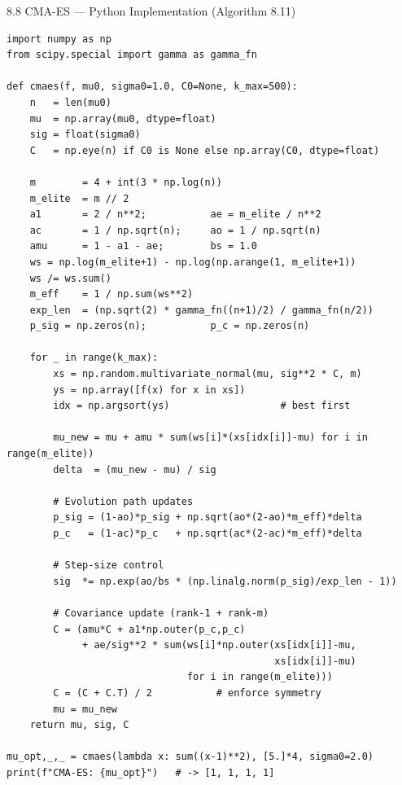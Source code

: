 \documentclass[aspectratio=169,10pt]{beamer}
\begin{document}
\begin{frame}[fragile]{8.8 CMA-ES --- Python Implementation (Algorithm 8.11)}
\begin{lstlisting}[caption={CMA-ES: covariance matrix adaptation evolution strategy}]
import numpy as np
from scipy.special import gamma as gamma_fn

def cmaes(f, mu0, sigma0=1.0, C0=None, k_max=500):
    n   = len(mu0)
    mu  = np.array(mu0, dtype=float)
    sig = float(sigma0)
    C   = np.eye(n) if C0 is None else np.array(C0, dtype=float)

    m        = 4 + int(3 * np.log(n))
    m_elite  = m // 2
    a1       = 2 / n**2;           ae = m_elite / n**2
    ac       = 1 / np.sqrt(n);     ao = 1 / np.sqrt(n)
    amu      = 1 - a1 - ae;        bs = 1.0
    ws = np.log(m_elite+1) - np.log(np.arange(1, m_elite+1))
    ws /= ws.sum()
    m_eff    = 1 / np.sum(ws**2)
    exp_len  = (np.sqrt(2) * gamma_fn((n+1)/2) / gamma_fn(n/2))
    p_sig = np.zeros(n);           p_c = np.zeros(n)

    for _ in range(k_max):
        xs = np.random.multivariate_normal(mu, sig**2 * C, m)
        ys = np.array([f(x) for x in xs])
        idx = np.argsort(ys)                   # best first

        mu_new = mu + amu * sum(ws[i]*(xs[idx[i]]-mu) for i in range(m_elite))
        delta  = (mu_new - mu) / sig

        # Evolution path updates
        p_sig = (1-ao)*p_sig + np.sqrt(ao*(2-ao)*m_eff)*delta
        p_c   = (1-ac)*p_c   + np.sqrt(ac*(2-ac)*m_eff)*delta

        # Step-size control
        sig  *= np.exp(ao/bs * (np.linalg.norm(p_sig)/exp_len - 1))

        # Covariance update (rank-1 + rank-m)
        C = (amu*C + a1*np.outer(p_c,p_c)
             + ae/sig**2 * sum(ws[i]*np.outer(xs[idx[i]]-mu,
                                              xs[idx[i]]-mu)
                               for i in range(m_elite)))
        C = (C + C.T) / 2           # enforce symmetry
        mu = mu_new
    return mu, sig, C

mu_opt,_,_ = cmaes(lambda x: sum((x-1)**2), [5.]*4, sigma0=2.0)
print(f"CMA-ES: {mu_opt}")   # -> [1, 1, 1, 1]
\end{lstlisting}
\end{frame}
\end{document}
